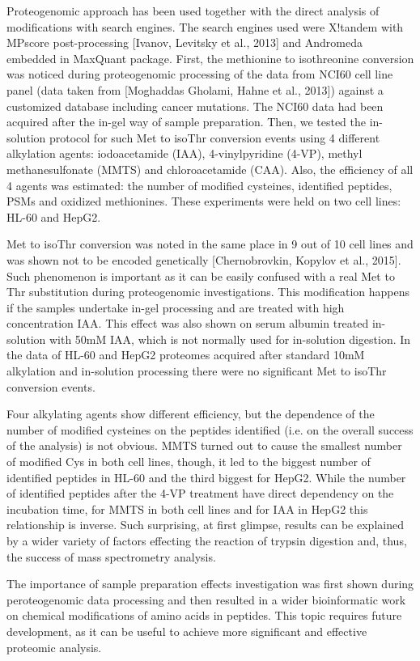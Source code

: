 Proteogenomic approach has been used together with the direct analysis of modifications with search engines. The search engines used were X!tandem with MPscore post-processing [Ivanov, Levitsky et al., 2013] and Andromeda embedded in MaxQuant package. First, the methionine to isothreonine conversion was noticed during proteogenomic processing of the data from NCI60 cell line panel (data taken from [Moghaddas Gholami, Hahne et al., 2013]) against a customized database including cancer mutations. The NCI60 data had been acquired after the in-gel way of sample preparation. Then, we tested the in-solution protocol for such Met to isoThr conversion events using 4 different alkylation agents: iodoacetamide (IAA), 4-vinylpyridine (4-VP), methyl methanesulfonate (MMTS) and chloroacetamide (CAA). Also, the efficiency of all 4 agents was estimated: the number of modified cysteines, identified peptides, PSMs and oxidized methionines. These experiments were held on two cell lines: HL-60 and HepG2.

Met to isoThr conversion was noted in the same place in 9 out of 10 cell lines and was shown not to be encoded genetically [Chernobrovkin, Kopylov et al., 2015]. Such phenomenon is important as it can be easily confused with a real Met to Thr substitution during proteogenomic investigations. This modification happens if the samples undertake in-gel processing and are treated with high concentration IAA. This effect was also shown on serum albumin treated in-solution with 50mM IAA, which is not normally used for in-solution digestion. In the data of HL-60 and HepG2 proteomes acquired after standard 10mM alkylation and in-solution processing there were no significant Met to isoThr conversion events.

Four alkylating agents show different efficiency, but the dependence of the number of modified cysteines on the peptides identified (i.e. on the overall success of the analysis) is not obvious. MMTS turned out to cause the smallest number of modified Cys in both cell lines, though, it led to the biggest number of identified peptides in HL-60 and the third biggest for HepG2. While the number of identified peptides after the 4-VP treatment have direct dependency on the incubation time, for MMTS in both cell lines and for IAA in HepG2 this relationship is inverse. Such surprising, at first glimpse, results can be explained by a wider variety of factors effecting the reaction of trypsin digestion and, thus, the success of mass spectrometry analysis.

The importance of sample preparation effects investigation was first shown during peroteogenomic data processing and then resulted in a wider bioinformatic work on chemical modifications of amino acids in peptides. This topic requires future development, as it can be useful to achieve more significant and effective proteomic analysis.


